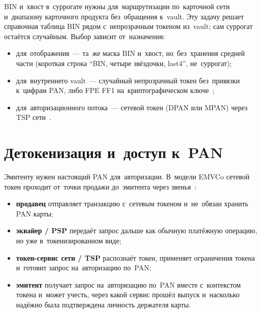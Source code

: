 BIN и~хвост в~суррогате нужны для~маршрутизации по~карточной сети
и~диапазону карточного продукта без~обращения к~vault. Эту задачу
решает справочная таблица BIN рядом с~непрозрачным токеном из~vault;
сам суррогат остаётся случайным. Выбор зависит от~назначения:
\begin{itemize}
  \item для~отображения~--- та~же маска BIN и~хвост, но~без~хранения
    средней части (короткая строка \enquote{BIN, четыре звёздочки,
    last4}, не~суррогат);
  \item для~внутреннего vault~--- случайный непрозрачный токен
    без~привязки к~цифрам PAN, либо FPE FF1 на~криптографическом
    ключе~\cite{nist-sp-800-38g};
  \item для~авторизационного потока~--- сетевой токен (DPAN или MPAN)
    через TSP сети~\cite{emvco-payment-tokenisation}.
\end{itemize}

\section{Детокенизация и~доступ к~PAN}\label{sec:token-detokenization}

Эмитенту нужен настоящий PAN для~авторизации. В~модели EMVCo сетевой токен
проходит от~точки продажи до~эмитента
через звенья~\cite{emvco-payment-tokenisation}:

\begin{itemize}
  \item \textbf{продавец} отправляет транзакцию с~сетевым токеном и~не~обязан
    хранить PAN карты;
  \item \textbf{эквайер / PSP} передаёт запрос дальше как обычную платёжную
    операцию, но уже в~токенизированном виде;
  \item \textbf{токен-сервис сети / TSP} распознаёт токен, применяет
    ограничения токена и~готовит запрос на~авторизацию по~PAN;
  \item \textbf{эмитент} получает запрос на~авторизацию по~PAN вместе
    с~контекстом токена и~может учесть, через какой сервис прошёл выпуск
    и~насколько надёжно была подтверждена личность держателя карты.
\end{itemize}

